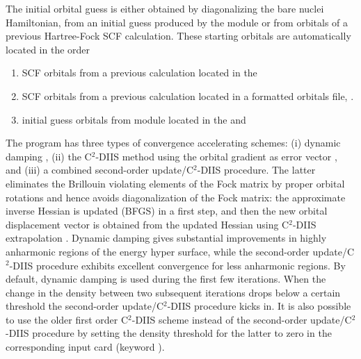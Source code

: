 The initial orbital guess is either obtained by diagonalizing the bare nuclei
Hamiltonian, from an initial guess produced by the module 
or from orbitals of a previous Hartree-Fock SCF calculation.
These starting orbitals are automatically located in the order
\begin{enumerate}
\item SCF orbitals from a previous calculation located in the 
\item SCF orbitals from a previous calculation located in a formatted orbitals file, .
\item initial guess orbitals from module  located in the  and
\end{enumerate}
The program has three types of convergence accelerating schemes:
(i) dynamic damping \cite{Karlstroem_SCFdyndumping}, (ii) the C$^2$-DIIS method
using the orbital gradient as error vector \cite{c2-diis}, and (iii)
a combined second-order update/C$^2$-DIIS procedure. The latter eliminates the
Brillouin violating elements of the Fock matrix by proper orbital rotations
and hence avoids diagonalization of the Fock matrix: the approximate inverse
Hessian is updated (BFGS) in a first step, and then the new orbital
displacement vector is obtained from the updated Hessian using C$^2$-DIIS
extrapolation \cite{FischerAlmloef_OrbRot}.
Dynamic damping gives substantial improvements in highly anharmonic
regions of the energy hyper surface, while the second-order
update/C$^2$-DIIS procedure exhibits excellent convergence for less anharmonic
regions. By default, dynamic damping is used during the first few iterations.
When the change in the density between two subsequent iterations drops below
a certain threshold the second-order update/C$^2$-DIIS procedure kicks in.
It is also possible to use the older first order C$^2$-DIIS scheme instead of
the second-order update/C$^2$-DIIS procedure by setting the density threshold
for the latter to zero in the corresponding input card (keyword
). \\

